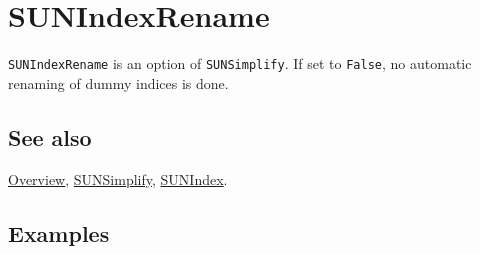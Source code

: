 \documentclass[../FeynCalcManual.tex]{subfiles}
\begin{document}
\hypertarget{sunindexrename}{
\section{SUNIndexRename}\label{sunindexrename}}

\texttt{SUNIndexRename} is an option of \texttt{SUNSimplify}. If set to
\texttt{False}, no automatic renaming of dummy indices is done.

\subsection{See also}

\hyperlink{toc}{Overview}, \hyperlink{sunsimplify}{SUNSimplify},
\hyperlink{sunindex}{SUNIndex}.

\subsection{Examples}
\end{document}
